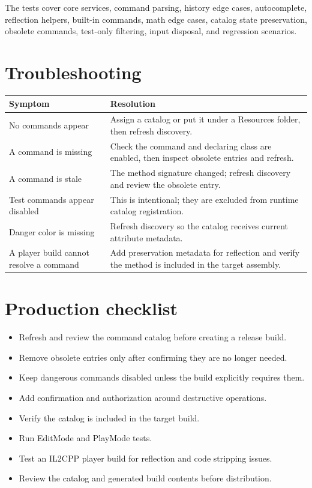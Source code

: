 \documentclass[11pt,a4paper]{article}
\begin{document}
The tests cover core services, command parsing, history edge cases, autocomplete, reflection helpers, built-in commands, math edge cases, catalog state preservation, obsolete commands, test-only filtering, input disposal, and regression scenarios.

\section{Troubleshooting}

\begin{longtable}{p{}p{}}
\toprule
\textbf{Symptom} & \textbf{Resolution} \\
\midrule
No commands appear & Assign a catalog or put it under a Resources folder, then refresh discovery. \\
A command is missing & Check the command and declaring class are enabled, then inspect obsolete entries and refresh. \\
A command is stale & The method signature changed; refresh discovery and review the obsolete entry. \\
Test commands appear disabled & This is intentional; they are excluded from runtime catalog registration. \\
Danger color is missing & Refresh discovery so the catalog receives current attribute metadata. \\
A player build cannot resolve a command & Add preservation metadata for reflection and verify the method is included in the target assembly. \\
\bottomrule
\end{longtable}

\section{Production checklist}

\begin{itemize}[leftmargin=*]
  \item Refresh and review the command catalog before creating a release build.
  \item Remove obsolete entries only after confirming they are no longer needed.
  \item Keep dangerous commands disabled unless the build explicitly requires them.
  \item Add confirmation and authorization around destructive operations.
  \item Verify the catalog is included in the target build.
  \item Run EditMode and PlayMode tests.
  \item Test an IL2CPP player build for reflection and code stripping issues.
  \item Review the catalog and generated build contents before distribution.
\end{itemize}
\end{document}
